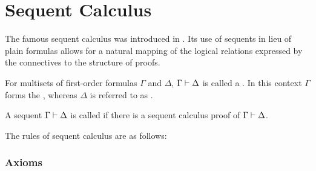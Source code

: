 \section{Sequent Calculus}

The famous sequent calculus was introduced in \cite{Gentzen}.
Its use of sequents in lieu of plain formulas allows for a natural mapping of the logical relations expressed by the connectives to the structure of proofs.

\begin{defi} 
	For multisets of first-order formulas $\Gamma$ and $\Delta$,  $\Gamma \vdash \Delta$ is called a . 
	In this context $\Gamma$ forms the , whereas $\Delta$ is referred to as .

	A sequent $\Gamma \vdash \Delta$ is called  if there is a sequent calculus proof of $\Gamma \vdash \Delta$.
\end{defi}

The rules of sequent calculus are as follows:
\newcommand{\calculussec}[1]{\subsubsection*{#1}\nopagebreak}
\newenvironment{lkdefsec}{
		\begin{adjustwidth}{0.05\textwidth}{0.05\textwidth}
		}{
		\end{adjustwidth}
}
\begin{lkdefsec}
	\calculussec{Axioms}
	\begin{multicols}{2}
		\begin{prooftree}
		\end{prooftree}

		\begin{prooftree}
			\AxiomCm{\fCenter t=t}
		\end{prooftree}
	\end{multicols}

\end{lkdefsec}

